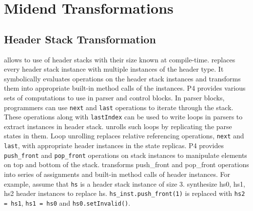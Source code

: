 \documentclass[letterpaper,twocolumn,10pt]{article}
\begin{document}
\section{\ucomp Midend Transformations}

\subsection{Header Stack Transformation}
\label{subsection:header-stack-transformation}
\ulang allows to use of header stacks with their size known at 
compile-time. 
\ucomp replaces every header stack instance with multiple instances of 
the header type. 
It symbolically evaluates operations on the header stack instances and 
transforms them into appropriate built-in method calls of the 
instances.
P4 provides various sets of computations to use in parser and control 
blocks.
In parser blocks, programmers can use \texttt{next} and \texttt{last} 
operations to iterate through the stack.
These operations along with \texttt{lastIndex} can be used to write 
loops in parsers to extract instances in header stack.
\ucomp unrolls such loops by replicating the parse states in them.
Loop unrolling replaces relative referencing operations, \texttt{next} 
and \texttt{last}, with appropriate header instances in the state 
replicas.
P4 provides \texttt{push\_front} and \texttt{pop\_front} operations on 
stack instances to manipulate elements on top and bottom of the stack.
\ucomp transforms push\_front and pop\_front operations into series of 
assignments and built-in method calls of header instances.
For example, assume that \texttt{hs} is a header stack instance of 
size 3. 
\ucomp synthesize hs0, hs1, hs2 header instances to replace hs.
\texttt{hs\_inst.push\_front(1)} is replaced with \texttt{hs2 = hs1}, 
\texttt{hs1 = hs0} and \texttt{hs0.setInvalid()}.
\end{document}
